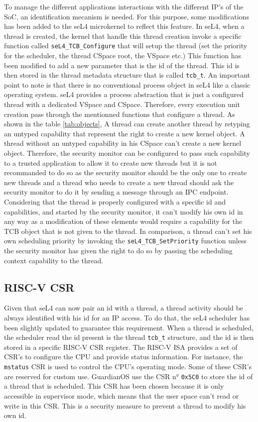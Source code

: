 \documentclass[conference]{IEEEtran}
\begin{document}
To manage the different applications interactions with the different IP's of the SoC, an identification mecanism is needed. For this purpose, some modifications has been added to the seL4 microkernel to reflect this feature. In seL4, when a thread is created, the kernel that handle this thread creation invoke a specific function called \texttt{seL4\_TCB\_Configure} that will setup the thread (set the priority for the scheduler, the thread CSpace root, the VSpace etc.) This function has been modified to add a new parameter that is the id of the thread. This id is then stored in the thread metadata structure that is called \texttt{tcb\_t}.  An important point to note is that there is no conventional process object in seL4 like a classic operating system. seL4 provides a process abstraction that is just a configured thread with a dedicated VSpace and CSpace. Therefore, every execution unit creation pass through the mentionned functions that configure a thread. As shown in the table \ref{tab:objects}, A thread can create another thread by retyping an untyped capability that represent the right to create a new kernel object. A thread without an untyped capability in his CSpace can't create a new kernel object. Therefore, the security monitor can be configured to pass such capability to a trusted application to allow it to create new threads but it is not recommanded to do so as the security monitor should be the only one to create new threads and a thread who needs to create a new thread should ask the security monitor to do it by sending a message through an IPC endpoint. Considering that the thread is properly configured with a specific id and capabilities, and started by the security monitor, it can't modify his own id in any way as a modification of these elements would require a capability for the TCB object that is not given to the thread. In comparison, a thread can't set his own scheduling priority by invoking the \texttt{seL4\_TCB\_SetPriority} function unless the security monitor has given the right to do so by passing the scheduling context capability to the thread.

\subsection{RISC-V CSR}
Given that seL4 can now pair an id with a thread, a thread activity should be always identified with his id for an IP access. To do that, the seL4 scheduler has been slightly updated to guarantee this requirement. When a thread is scheduled, the scheduler read the id present is the thread \texttt{tcb\_t} structure, and the id is then stored in a specific RISC-V CSR register. The RISC-V ISA provides a set of CSR's to configure the CPU and provide status information. For instance, the \texttt{mstatus} CSR is used to control the CPU's operating mode. Some of these CSR's are reserved for custom use. GuardianOS use the CSR n° \texttt{0x5C0} to store the id of a thread that is scheduled. This CSR has been chosen because it is only accessible in supervisor mode, which means that the user space can't read or write in this CSR. This is a security measure to prevent a thread to modify his own id.
\end{document}
